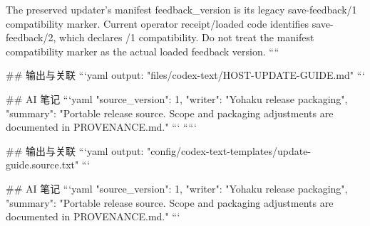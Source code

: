 The preserved updater's manifest feedback_version is its legacy save-feedback/1 compatibility marker. Current operator receipt/loaded code identifies save-feedback/2, which declares /1 compatibility. Do not treat the manifest compatibility marker as the actual loaded feedback version.
````

## 输出与关联
```yaml
output: "files/codex-text/HOST-UPDATE-GUIDE.md"
```

## AI 笔记
```yaml
{"source_version": 1, "writer": "Yohaku release packaging", "summary": "Portable release source. Scope and packaging adjustments are documented in PROVENANCE.md."}
```
`````

## 输出与关联
```yaml
output: "config/codex-text-templates/update-guide.source.txt"
```

## AI 笔记
```yaml
{"source_version": 1, "writer": "Yohaku release packaging", "summary": "Portable release source. Scope and packaging adjustments are documented in PROVENANCE.md."}
```
